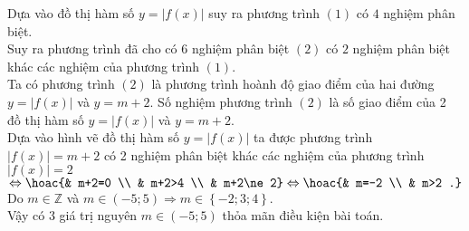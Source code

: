 \begin{ex}
{\begin{center}
		\end{center}
		Dựa vào đồ thị hàm số $ y=\left| f(x) \right|$ suy ra phương trình $(1)$ có $4$ nghiệm phân biệt.\\
		Suy ra phương trình đã cho có $6$ nghiệm phân biệt $(2)$ có $2$ nghiệm phân biệt khác các nghiệm của phương trình $(1)$.\\
		Ta có phương trình $(2)$ là phương trình hoành độ giao điểm của hai đường$ y=\left| f(x) \right|$ và $ y=m+2$. Số nghiệm phương trình $(2)$ là số giao điểm của 2 đồ thị hàm số $y=\left| f(x) \right|$ và $y=m+2$. \\
		Dựa vào hình vẽ đồ thị hàm số $y=\left| f(x) \right|$ ta được phương trình $\left| f(x) \right|=m+2$ có 2 nghiệm phân biệt khác các nghiệm của phương trình $\left| f(x) \right|=2$ $\Leftrightarrow \hoac{& m+2=0 \\ & m+2>4 \\ & m+2\ne 2} \Leftrightarrow \hoac{& m=-2 \\  & m>2 .}$\\
		Do $ m\in \mathbb{Z}$ và $ m\in (-5;5)\Rightarrow m\in \left\{-2;3;4 \right\}$.\\
		Vậy có 3 giá trị nguyên $ m\in ( -5;5 )$ thỏa mãn điều kiện bài toán.} 
\end{ex}
